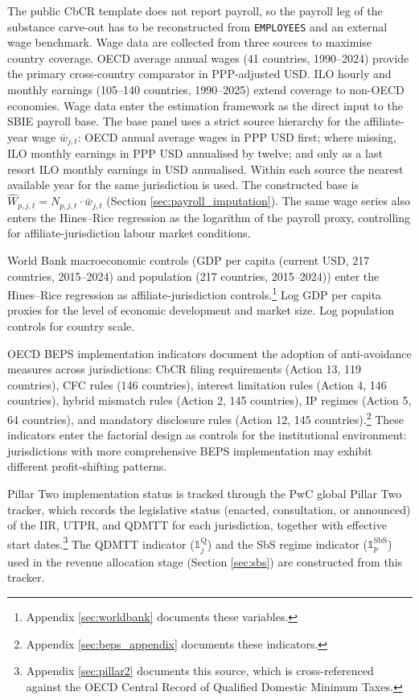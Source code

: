 \documentclass[11pt,a4paper]{article}
\newcommand{\code}[1]{\texttt{#1}}
\begin{document}
The public CbCR template does not report payroll, so the payroll leg of the substance carve-out has to be reconstructed from \code{EMPLOYEES} and an external wage benchmark. Wage data are collected from three sources to maximise country coverage. OECD average annual wages (41 countries, 1990--2024) provide the primary cross-country comparator in PPP-adjusted USD. ILO hourly and monthly earnings (105--140 countries, 1990--2025) extend coverage to non-OECD economies. Wage data enter the estimation framework as the direct input to the SBIE payroll base. The base panel uses a strict source hierarchy for the affiliate-year wage $\bar{w}_{j,t}$: OECD annual average wages in PPP USD first; where missing, ILO monthly earnings in PPP USD annualised by twelve; and only as a last resort ILO monthly earnings in USD annualised. Within each source the nearest available year for the same jurisdiction is used. The constructed base is $\hat{W}_{p,j,t} = N_{p,j,t} \cdot \bar{w}_{j,t}$ (Section \ref{sec:payroll_imputation}). The same wage series also enters the Hines--Rice regression as the logarithm of the payroll proxy, controlling for affiliate-jurisdiction labour market conditions.

World Bank macroeconomic controls (GDP per capita (current USD, 217 countries, 2015--2024) and population (217 countries, 2015--2024)) enter the Hines--Rice regression as affiliate-jurisdiction controls.\footnote{Appendix \ref{sec:worldbank} documents these variables.} Log GDP per capita proxies for the level of economic development and market size. Log population controls for country scale.

OECD BEPS implementation indicators document the adoption of anti-avoidance measures across jurisdictions: CbCR filing requirements (Action 13, 119 countries), CFC rules (146 countries), interest limitation rules (Action 4, 146 countries), hybrid mismatch rules (Action 2, 145 countries), IP regimes (Action 5, 64 countries), and mandatory disclosure rules (Action 12, 145 countries).\footnote{Appendix \ref{sec:beps_appendix} documents these indicators.} These indicators enter the factorial design as controls for the institutional environment: jurisdictions with more comprehensive BEPS implementation may exhibit different profit-shifting patterns.

Pillar Two implementation status is tracked through the PwC global Pillar Two tracker, which records the legislative status (enacted, consultation, or announced) of the IIR, UTPR, and QDMTT for each jurisdiction, together with effective start dates.\footnote{Appendix \ref{sec:pillar2} documents this source, which is cross-referenced against the OECD Central Record of Qualified Domestic Minimum Taxes.} The QDMTT indicator ($\mathbb{1}_j^{\text{Q}}$) and the SbS regime indicator ($\mathbb{1}_p^{\text{SbS}}$) used in the revenue allocation stage (Section \ref{sec:sbs}) are constructed from this tracker.
\end{document}
